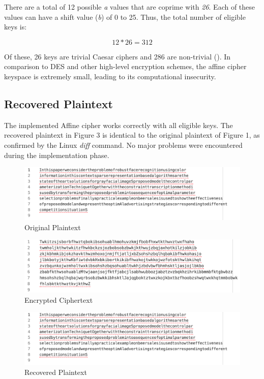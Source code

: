 \documentclass[]{article}
\begin{document}
\noindent
There are a total of 12 possible \textit{a} values that are coprime with \textit{26}. Each of these values can have a shift value (\textit{b}) of 0 to 25. Thus, the total number of eligible keys is:

$$12*26=312$$

\noindent
Of these, 26 keys are trivial Caesar ciphers and 286 are non-trivial (\cite{maintext}). In comparison to DES and other high-level encryption schemes, the affine cipher keyspace is extremely small, leading to its computational insecurity.


\newpage
\subsection*{Recovered Plaintext}

The implemented Affine cipher works correctly with all eligible keys. The recovered plaintext in Figure 3 is identical to the original plaintext of Figure 1, as confirmed by the Linux \textit{diff} command. No major problems were encountered during the implementation phase.
\vspace{1cm}
\begin{figure}[H]
	\includegraphics[width=\textwidth]{affine_plaintext.png}
	\caption{Original Plaintext}
	\centering
\end{figure}

\begin{figure}[H]
	\includegraphics[width=\textwidth]{affine_ciphertext.png}
	\caption{Encrypted Ciphertext}
	\centering
\end{figure}

\begin{figure}[H]
	\includegraphics[width=\textwidth]{affine_plaintext.png}
	\caption{Recovered Plaintext}
	\centering
\end{figure}
\end{document}
